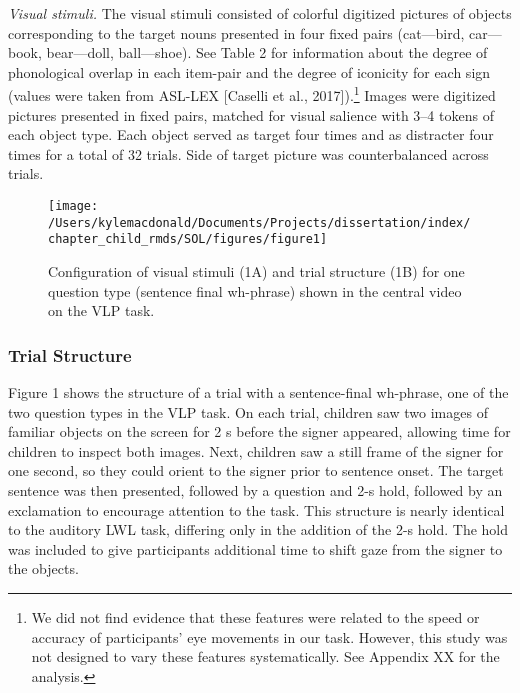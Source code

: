 \documentclass[oneside]{report}
\begin{document}
\emph{Visual stimuli.} The visual stimuli consisted of colorful
digitized pictures of objects corresponding to the target nouns
presented in four fixed pairs (cat---bird, car---book, bear---doll,
ball---shoe). See Table 2 for information about the degree of
phonological overlap in each item-pair and the degree of iconicity for
each sign (values were taken from ASL-LEX {[}Caselli et al.,
2017{]}).\footnote{We did not find evidence that these features were
  related to the speed or accuracy of participants' eye movements in our
  task. However, this study was not designed to vary these features
  systematically. See Appendix XX for the analysis.} Images were
digitized pictures presented in fixed pairs, matched for visual salience
with 3--4 tokens of each object type. Each object served as target four
times and as distracter four times for a total of 32 trials. Side of
target picture was counterbalanced across trials.
\begin{figure}[!t]

{\centering \texttt{[image: /Users/kylemacdonald/Documents/Projects/dissertation/index/chapter\_child\_rmds/SOL/figures/figure1]} 

}

\caption[Stimuli in the Visual Language Processing Task used in Experiment 1.1]{Configuration of visual stimuli (1A) and trial structure (1B) for one question type (sentence final wh-phrase) shown in the central video on the VLP task.}\label{fig:sol-trial-fig}
\end{figure}
\subsubsection{Trial Structure}\label{trial-structure}

Figure 1 shows the structure of a trial with a sentence-final wh-phrase,
one of the two question types in the VLP task. On each trial, children
saw two images of familiar objects on the screen for 2 s before the
signer appeared, allowing time for children to inspect both images.
Next, children saw a still frame of the signer for one second, so they
could orient to the signer prior to sentence onset. The target sentence
was then presented, followed by a question and 2-s hold, followed by an
exclamation to encourage attention to the task. This structure is nearly
identical to the auditory LWL task, differing only in the addition of
the 2-s hold. The hold was included to give participants additional time
to shift gaze from the signer to the objects.
\end{document}

